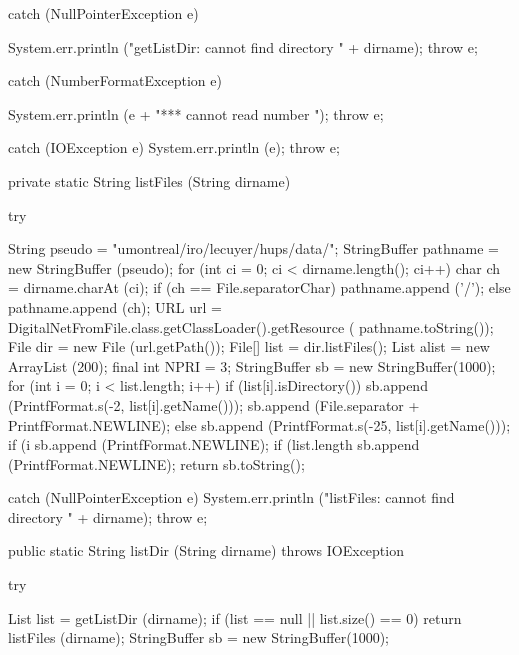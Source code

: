 \begin{code}
\begin{hide}
{{      } catch (NullPointerException e) {
         System.err.println ("getListDir: cannot find directory   " + dirname);
         throw e;

      } catch (NumberFormatException e) {
         System.err.println (e + "***   cannot read number ");
         throw e;

      }  catch (IOException e) {
         System.err.println (e);
         throw e;
      }
   }


   private static String listFiles (String dirname) {
      try {
         String pseudo = "umontreal/iro/lecuyer/hups/data/";
         StringBuffer pathname = new StringBuffer (pseudo);
         for (int ci = 0; ci < dirname.length(); ci++) {
            char ch = dirname.charAt (ci);
            if (ch == File.separatorChar)
               pathname.append ('/');
            else
               pathname.append (ch);
         }
         URL url = DigitalNetFromFile.class.getClassLoader().getResource (
                      pathname.toString());
         File dir = new File (url.getPath());
         File[] list = dir.listFiles();
         List alist = new ArrayList (200);
         final int NPRI = 3;
         StringBuffer sb = new StringBuffer(1000);
         for (int i = 0; i < list.length; i++) {
            if (list[i].isDirectory()) {
               sb.append (PrintfFormat.s(-2, list[i].getName()));
               sb.append (File.separator + PrintfFormat.NEWLINE);
            } else {
               sb.append (PrintfFormat.s(-25, list[i].getName()));
               if (i %
                  sb.append (PrintfFormat.NEWLINE);
            }
         }
         if (list.length %
            sb.append (PrintfFormat.NEWLINE);
         return sb.toString();

      } catch (NullPointerException e) {
         System.err.println ("listFiles: cannot find directory   " + dirname);
         throw e;
      }
   }\end{hide}

   public static String listDir (String dirname) throws IOException \begin{hide} {
      try {
         List list = getListDir (dirname);
         if (list == null || list.size() == 0)
            return listFiles (dirname);
         StringBuffer sb = new StringBuffer(1000);

}}
\end{hide}
\end{code}
